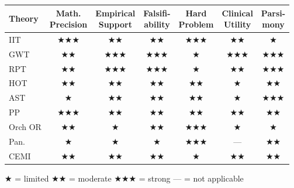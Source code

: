 \documentclass[11pt,a4paper]{report}
\begin{document}
\begin{center}
\renewcommand{\arraystretch}{1.35}
\small
\begin{tabular}{>{\raggedright}p{1.4cm} c c c c c c}
  \toprule
  \textbf{Theory} & \makecell{\textbf{Math.}\\\textbf{Precision}} & \makecell{\textbf{Empirical}\\\textbf{Support}} & \makecell{\textbf{Falsifi-}\\\textbf{ability}} & \makecell{\textbf{Hard}\\\textbf{Problem}} & \makecell{\textbf{Clinical}\\\textbf{Utility}} & \makecell{\textbf{Parsi-}\\\textbf{mony}} \\
  \midrule
  IIT       & $\bigstar\bigstar\bigstar$ & $\bigstar\bigstar$ & $\bigstar\bigstar$ & $\bigstar\bigstar\bigstar$ & $\bigstar\bigstar$ & $\bigstar$ \\
  GWT       & $\bigstar\bigstar$ & $\bigstar\bigstar\bigstar$ & $\bigstar\bigstar\bigstar$ & $\bigstar$ & $\bigstar\bigstar\bigstar$ & $\bigstar\bigstar\bigstar$ \\
  RPT       & $\bigstar\bigstar$ & $\bigstar\bigstar\bigstar$ & $\bigstar\bigstar\bigstar$ & $\bigstar$ & $\bigstar\bigstar$ & $\bigstar\bigstar\bigstar$ \\
  HOT       & $\bigstar\bigstar$ & $\bigstar\bigstar$ & $\bigstar\bigstar$ & $\bigstar\bigstar$ & $\bigstar$ & $\bigstar\bigstar$ \\
  AST       & $\bigstar$ & $\bigstar\bigstar$ & $\bigstar\bigstar$ & $\bigstar\bigstar$ & $\bigstar$ & $\bigstar\bigstar\bigstar$ \\
  PP        & $\bigstar\bigstar\bigstar$ & $\bigstar\bigstar$ & $\bigstar\bigstar$ & $\bigstar\bigstar$ & $\bigstar\bigstar$ & $\bigstar\bigstar$ \\
  Orch OR   & $\bigstar\bigstar$ & $\bigstar$ & $\bigstar\bigstar$ & $\bigstar\bigstar\bigstar$ & $\bigstar$ & $\bigstar$ \\
  Pan.      & $\bigstar$ & $\bigstar$ & $\bigstar$ & $\bigstar\bigstar\bigstar$ & --- & $\bigstar\bigstar$ \\
  CEMI      & $\bigstar\bigstar$ & $\bigstar\bigstar$ & $\bigstar\bigstar$ & $\bigstar$ & $\bigstar\bigstar$ & $\bigstar\bigstar$ \\
  \bottomrule
\end{tabular}

\vspace{4pt}
{\footnotesize $\bigstar$ = limited \quad $\bigstar\bigstar$ = moderate \quad $\bigstar\bigstar\bigstar$ = strong \quad --- = not applicable}
\end{center}
\end{document}
